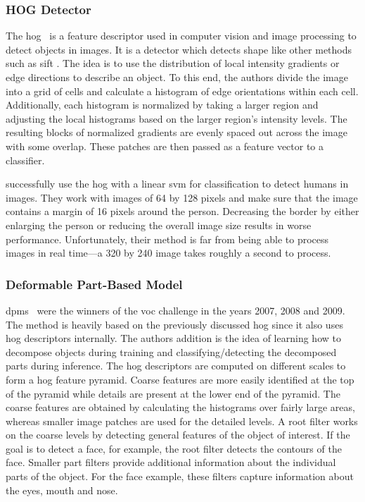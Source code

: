 \documentclass[draft,final]{vutinfth} %
\begin{document}
\subsubsection{HOG Detector}
\label{sssec:obj-hog}

The \gls{hog}~\cite{dalal2005} is a feature descriptor used in
computer vision and image processing to detect objects in images. It
is a detector which detects shape like other methods such as
\gls{sift} \cite{lowe1999}. The idea is to use the distribution of
local intensity gradients or edge directions to describe an object. To
this end, the authors divide the image into a grid of cells and
calculate a histogram of edge orientations within each
cell. Additionally, each histogram is normalized by taking a larger
region and adjusting the local histograms based on the larger region's
intensity levels. The resulting blocks of normalized gradients are
evenly spaced out across the image with some overlap. These patches
are then passed as a feature vector to a classifier.

\textcite{dalal2005} successfully use the \gls{hog} with a linear
\gls{svm} for classification to detect humans in images. They work
with images of 64 by 128 pixels and make sure that the image contains
a margin of 16 pixels around the person. Decreasing the border by
either enlarging the person or reducing the overall image size results
in worse performance. Unfortunately, their method is far from being
able to process images in real time—a 320 by 240 image takes roughly a
second to process.

\subsubsection{Deformable Part-Based Model}
\label{sssec:obj-dpm}

\glspl{dpm}~\cite{felzenszwalb2008a} were the winners of the \gls{voc}
challenge in the years 2007, 2008 and 2009. The method is heavily
based on the previously discussed \gls{hog} since it also uses
\gls{hog} descriptors internally. The authors addition is the idea of
learning how to decompose objects during training and
classifying/detecting the decomposed parts during inference. The
\gls{hog} descriptors are computed on different scales to form a
\gls{hog} feature pyramid. Coarse features are more easily identified
at the top of the pyramid while details are present at the lower end
of the pyramid. The coarse features are obtained by calculating the
histograms over fairly large areas, whereas smaller image patches are
used for the detailed levels. A root filter works on the coarse levels
by detecting general features of the object of interest. If the goal
is to detect a face, for example, the root filter detects the contours
of the face. Smaller part filters provide additional information about
the individual parts of the object. For the face example, these
filters capture information about the eyes, mouth and nose.
\end{document}
